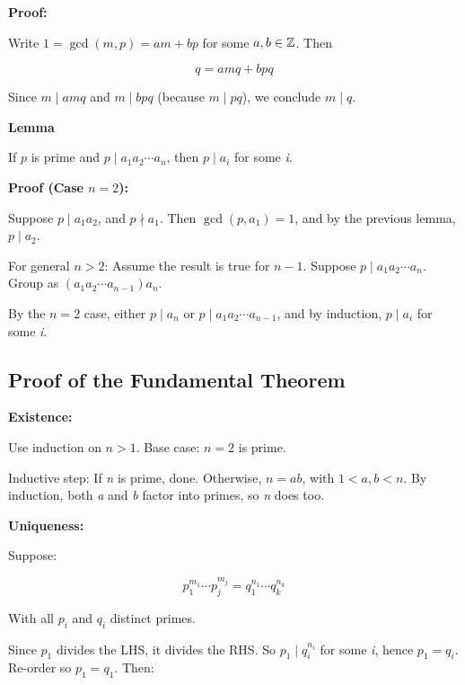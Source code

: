 \textbf{Proof:} 

Write \(1 = \gcd(m, p) = am + bp\) for some \(a, b \in \mathbb{Z}\). Then

\[
	q = amq + bpq
\]

Since \(m \mid amq\) and \(m \mid bpq\) (because \(m \mid pq\)), we conclude \(m \mid q\).

\QED

\textbf{Lemma} 

If \(p\) is prime and \(p \mid a_1a_2 \cdots a_n\), then \(p \mid a_i\) for some \emph{i}.
\vspace{\baselineskip}

\textbf{Proof (Case \(n=2\)):} 

Suppose \(p \mid a_1a_2\), and \(p \nmid a_1\).
Then \(\gcd(p, a_1) = 1\), and by the previous lemma, \(p \mid a_2\).
\vspace{\baselineskip}

For general \(n > 2\): Assume the result is true for \(n-1\). Suppose \(p \mid a_1a_2 \cdots a_n\).
Group as \((a_1a_2 \cdots a_{n-1})a_n\).
\vspace{\baselineskip}

By the \(n=2\) case, either \(p \mid a_n\) or \(p \mid a_1a_2 \cdots a_{n-1}\), and by induction, 
\(p \mid a_i\) for some \emph{i}.

\QED

\subsection{Proof of the Fundamental Theorem}

\textbf{Existence:}

Use induction on \(n > 1\). Base case: \(n = 2\) is prime.
\vspace{\baselineskip}

Inductive step: If \emph{n} is prime, done. Otherwise, \(n = ab\), with \(1 < a, b < n\).
By induction, both \emph{a} and \emph{b} factor into primes, so \emph{n} does too.
\vspace{\baselineskip}

\textbf{Uniqueness:}

Suppose:

\[
	p_1^{m_1} \cdots p_j^{m_j} = q_1^{n_1} \cdots q_k^{n_k}
\]

With all \(p_i\) and \(q_i\) distinct primes.
\vspace{\baselineskip}

Since \(p_1\) divides the LHS, it divides the RHS. So \(p_1 \mid q_i^{n_i}\) for some \emph{i}, hence 
\(p_1 = q_i\). Re-order so \(p_1 = q_1\). Then:

